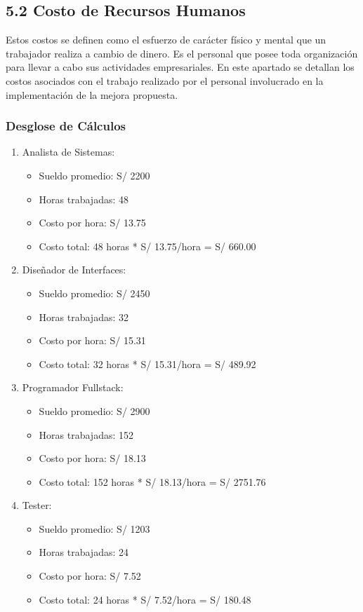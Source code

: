 \subsection{5.2 Costo de Recursos Humanos}
Estos costos se definen como el esfuerzo de carácter físico y mental que un trabajador realiza a cambio de dinero. Es el personal que posee toda organización para llevar a cabo sus actividades empresariales. En este apartado se detallan los costos asociados con el trabajo realizado por el personal involucrado en la implementación de la mejora propuesta.

\subsubsection*{Desglose de Cálculos}
\begin{enumerate}
    \item Analista de Sistemas:
    \begin{itemize}
        \item Sueldo promedio: S/ 2200
        \item Horas trabajadas: 48
        \item Costo por hora: S/ 13.75
        \item Costo total: 48 horas * S/ 13.75/hora = S/ 660.00
    \end{itemize}
    
    
    \item Diseñador de Interfaces:
    \begin{itemize}
        \item Sueldo promedio: S/ 2450
        \item Horas trabajadas: 32
        \item Costo por hora: S/ 15.31
        \item Costo total: 32 horas * S/ 15.31/hora = S/ 489.92
    \end{itemize}
    
    
    \item Programador Fullstack:
    \begin{itemize}
        \item Sueldo promedio: S/ 2900
        \item Horas trabajadas: 152
        \item Costo por hora: S/ 18.13
        \item Costo total: 152 horas * S/ 18.13/hora = S/ 2751.76
    \end{itemize}    
    
    \item Tester:
    \begin{itemize}
        \item Sueldo promedio: S/ 1203
        \item Horas trabajadas: 24
        \item Costo por hora: S/ 7.52
        \item Costo total: 24 horas * S/ 7.52/hora = S/ 180.48
    \end{itemize}
    
\end{enumerate}

